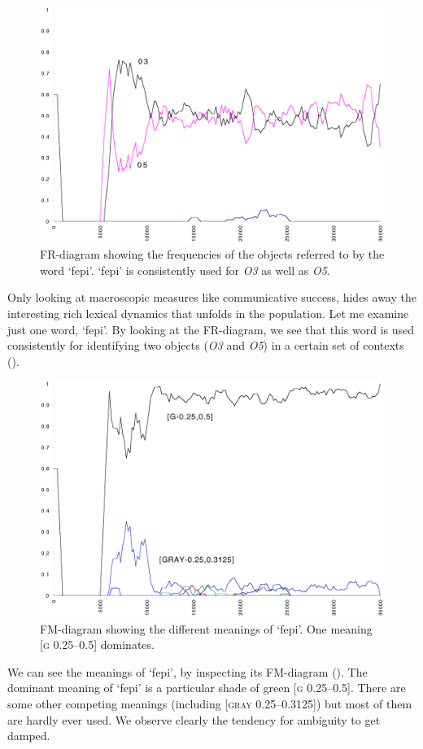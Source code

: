 \begin{figure}[htbp]
  \centerline{\includegraphics[width=.80\textwidth]{chap7/figs/FR-FEPI.pdf}}
\caption{\label{fr-fepi}FR-diagram showing the frequencies
of the objects referred to by the word
`fepi'. `fepi' is consistently used for \emph{O3} as well as
\emph{O5}.}
\end{figure}
Only looking at macroscopic measures like communicative
success, hides away the
interesting rich lexical dynamics that unfolds
in the population. Let me examine just one word, `fepi'. 
By looking at the FR-diagram, we see that this word is 
used consistently for identifying two objects
(\emph{O3} and \emph{O5}) in a certain set of contexts
(). 

\begin{figure}[htbp]
  \centerline{\includegraphics[width=.80\textwidth]{chap7/figs/FM-FEPI.pdf}}
\caption{\label{fm-fepi}FM-diagram showing the different
meanings of `fepi'. One meaning [\textsc{g} 0.25–0.5] dominates.}
\end{figure}
We can see the meanings of `fepi', by 
inspecting its FM-diagram (). 
The dominant meaning of `fepi' is 
a particular shade of green [\textsc{g} 0.25–0.5]. There are 
some other competing meanings (including [\textsc{gray} 0.25–0.3125])
but most of them are hardly ever used. We observe clearly 
the tendency for ambiguity to get damped. 

